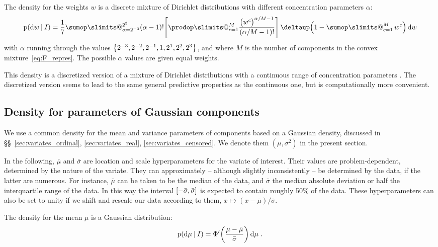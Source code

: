 \documentclass[\ifafour a4paper,12pt,\else a5paper,10pt,\fi%
onecolumn,oneside,article,%
british%
]{memoir}
\makeatletter
\theoremstyle{remark}
\theoremstyle{innote}
\def\sum{\DOTSI\sumop\slimits@}
\def\prod{\DOTSI\prodop\slimits@}
\newcommand*{\delt}{\deltaup}%
\newcommand*{\di}{\mathrm{d}}%
\newcommand*{\defd}{\coloneqq}
\DeclarePairedDelimiter\clcl{[}{]}
\DeclarePairedDelimiter\set{\{}{\}} %
\newcommand*{\p}{\mathrm{p}}%
\renewcommand*{\|}[1][]{\nonscript\:#1\vert\nonscript\:\mathopen{}}
\newcommand*{\sect}{\S}%
\newcommand*{\sects}{\S\S}%
\newcommand*{\eg}{{e.g.}}
\newcommand*{\tsum}{\mathop{\textstyle\sum}\nolimits}
\newcommand*{\muo}{\bar{\mu}}
\newcommand*{\sigmao}{\bar{\sigma}}
\makeatother
\begin{document}
The density for the weights $w$ is a discrete mixture of Dirichlet distributions with different concentration parameters $\alpha$:
\begin{equation}
  \label{eq:density_w}
  \p(\di w\|I) =
  \frac{1}{7}
  \sum_{\alpha=2^{-3}}^{2^{3}}
  (\alpha - 1)! \Biggl[\prod_{c=1}^{M}
  \frac{\bigl(w^{c}\bigr)^{\alpha/M-1}}{(\alpha/M -1)!} \Biggr]
  \, \delt\Bigl(1-\tsum_{c=1}^{M} w^{c}\Bigr)\,
  \di w
\end{equation}
with $\alpha$ running through the values $\set*{2^{-3},2^{-2},2^{-1},1,2^{1},2^{2},2^{3}}$, and where $M$ is the number of components in the convex mixture~\eqref{eq:F_repres}. The possible $\alpha$ values are given equal weights.

This density is a discretized version of a mixture of Dirichlet distributions with a continuous range of concentration parameters \autocites[\eg][\sect\,2.5]{rossi2014}[\sect\,2.1]{rasmussen1999}. The discretized version seems to lead to the same general predictive properties as the continuous one, but is computationally more convenient.


\subsection{Density for parameters of Gaussian components}
\label{sec:params_gaussian}

We use a common density for the mean and variance parameters of components based on a Gaussian density, discussed in \sects~\ref{sec:variates_ordinal}, \ref{sec:variates_real}, \ref{sec:variates_censored}. We denote them $(\mu, \sigma^{2})$ in the present section.

In the following, $\muo$ and $\sigmao$ are location and scale hyperparameters for the variate of interest. Their values are problem-dependent, determined by the nature of the variate. They can approximately -- although slightly inconsistently -- be determined by the data, if the latter are numerous. For instance, $\muo$ can be taken to be the median of the data, and $\sigmao$ the median absolute deviation or half the interquartile range of the data. In this way the interval $\clcl{-\sigmao, \sigmao}$ is expected to contain roughly 50\% of the data.%
These hyperparameters can also be set to unity if we shift and rescale our data according to them, $x \mapsto (x-\muo)/\sigmao$.


The density for the mean $\mu$ is a Gaussian distribution:
\begin{equation}
  \label{eq:density_mu}
  \p(\di \mu\|I) = \Phi'\biggl(\frac{\mu-\muo}{\sigmao}\biggr)\, \di\mu \ .
\end{equation}
\end{document}
